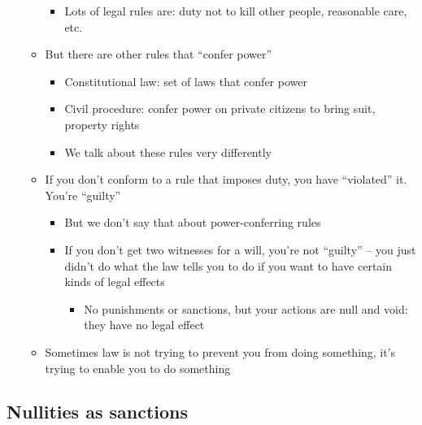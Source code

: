 \begin{itemize}
\begin{itemize}
    \begin{itemize}
    \tightlist
    \item
      Lots of legal rules are: duty not to kill other people, reasonable
      care, etc.
    \end{itemize}
  \item
    But there are other rules that ``confer power''

    \begin{itemize}
    \tightlist
    \item
      Constitutional law: set of laws that confer power
    \item
      Civil procedure: confer power on private citizens to bring suit,
      property rights
    \item
      We talk about these rules very differently
    \end{itemize}
  \item
    If you don't conform to a rule that imposes duty, you have
    ``violated'' it. You're ``guilty''

    \begin{itemize}
    \tightlist
    \item
      But we don't say that about power-conferring rules
    \item
      If you don't get two witnesses for a will, you're not ``guilty''
      -- you just didn't do what the law tells you to do if you want to
      have certain kinds of legal effects

      \begin{itemize}
      \tightlist
      \item
        No punishments or sanctions, but your actions are null and void:
        they have no legal effect
      \end{itemize}
    \end{itemize}
  \item
    Sometimes law is not trying to prevent you from doing something,
    it's trying to enable you to do something
  \end{itemize}
\end{itemize}

\hypertarget{nullities-as-sanctions}{%
\subsection{Nullities as sanctions}\label{nullities-as-sanctions}}

